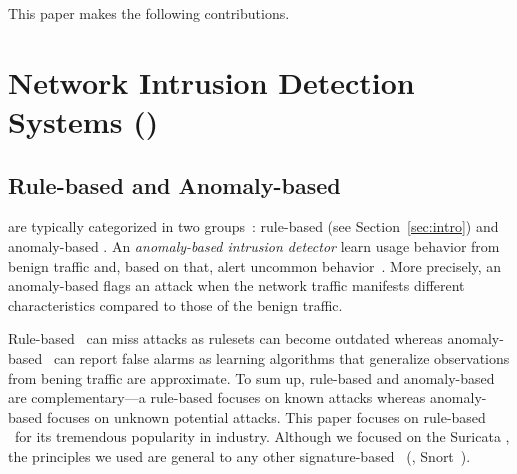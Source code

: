 \documentclass[sigconf,anonymous]{acmart}
\begin{document}



This paper makes the following contributions.

\section{Network Intrusion Detection Systems (\nids)}
\label{sec:background}

\subsection{Rule-based and Anomaly-based \nids}

\sloppy \nids{} are typically categorized in two
groups~\cite{kumar2007survey}: rule-based (see
Section~\ref{sec:intro}) and anomaly-based \nids. An
\emph{anomaly-based intrusion detector} learn usage behavior from
benign traffic and, based on that, alert uncommon
behavior~\cite{7579764,kumar2007survey,Mitchell:2014:SID:2597757.2542049,cordy-etal-issta19}. More
precisely, an anomaly-based \nids{} flags an attack when the network
traffic manifests different characteristics compared to those of the
benign traffic.

Rule-based \nids\ can miss attacks as rulesets can become outdated
whereas anomaly-based \nids\ can report false alarms as learning
algorithms that generalize observations from bening traffic are
approximate. To sum up, rule-based \nids{} and anomaly-based \nids{}
are complementary---a rule-based \nids{} focuses on known attacks
whereas anomaly-based \nids{} focuses on unknown potential attacks.
This paper focuses on rule-based \nids\ for its tremendous popularity
in industry. Although we focused on the Suricata \nids, the principles
we used are general to any other signature-based \nids~(\eg{},
Snort~\cite{snort}).
\end{document}
